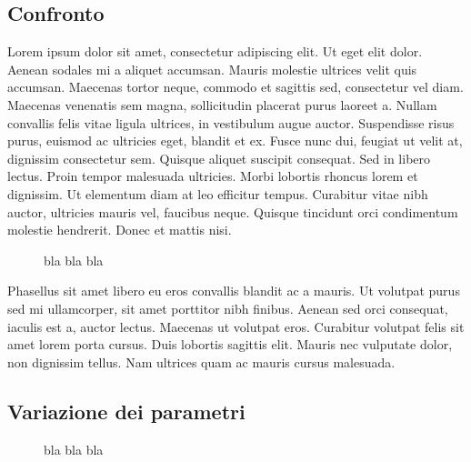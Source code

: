 \documentclass[a4paper]{article}
\begin{document}
\subsection{Confronto}

Lorem ipsum dolor sit amet, consectetur adipiscing elit. Ut eget elit dolor. Aenean sodales mi a aliquet accumsan. Mauris molestie ultrices velit quis accumsan. Maecenas tortor neque, commodo et sagittis sed, consectetur vel diam. Maecenas venenatis sem magna, sollicitudin placerat purus laoreet a. Nullam convallis felis vitae ligula ultrices, in vestibulum augue auctor. Suspendisse risus purus, euismod ac ultricies eget, blandit et ex. Fusce nunc dui, feugiat ut velit at, dignissim consectetur sem. Quisque aliquet suscipit consequat. Sed in libero lectus. Proin tempor malesuada ultricies. Morbi lobortis rhoncus lorem et dignissim. Ut elementum diam at leo efficitur tempus. Curabitur vitae nibh auctor, ultricies mauris vel, faucibus neque. Quisque tincidunt orci condimentum molestie hendrerit. Donec et mattis nisi.
\begin{figure}
   \begin{center}
       \vspace*{-1.1in}
       \centerline{\scalebox{1.3}{}}
   \end{center}
   \vspace*{-0.2in}
   \caption{bla bla bla}
\end{figure}
Phasellus sit amet libero eu eros convallis blandit ac a mauris. Ut volutpat purus sed mi ullamcorper, sit amet porttitor nibh finibus. Aenean sed orci consequat, iaculis est a, auctor lectus. Maecenas ut volutpat eros. Curabitur volutpat felis sit amet lorem porta cursus. Duis lobortis sagittis elit. Mauris nec vulputate dolor, non dignissim tellus. Nam ultrices quam ac mauris cursus malesuada.

\subsection{Variazione dei parametri}

\begin{figure}
    \begin{center}
        \scalebox{0.65}{}
    \end{center}
    \begin{center}
        \scalebox{0.65}{}
    \end{center}
    \begin{center}
      \scalebox{0.65}{}
    \end{center}
  \caption{bla bla bla}
\end{figure}
\end{document}
